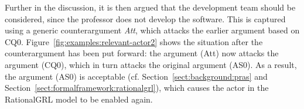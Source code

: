 Further in the discussion, it is then argued that the development team should be considered, since the professor does not develop the software. This is captured using a generic counterargument \emph{Att}, which attacks the earlier argument based on CQ0. Figure~\ref{fig:examples:relevant-actor2} shows the situation after the counterargument has been put forward: the argument (Att) now attacks the argument (CQ0), which in turn attacks the original argument (AS0). As a result, the argument (AS0) is acceptable (cf. Section~\ref{sect:background:pras} and Section~\ref{sect:formalframework:rationalgrl}), which causes the actor in the RationalGRL model to be enabled again.

